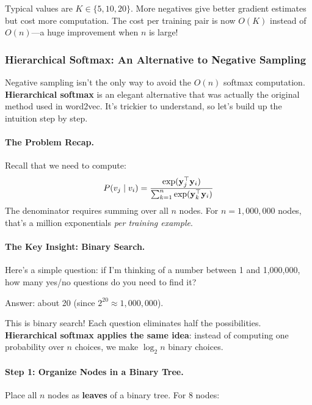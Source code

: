 \begin{notechapter}
\begin{remark}
Typical values are $K \in \{5, 10, 20\}$. More negatives give better gradient estimates but cost more computation. The cost per training pair is now $O(K)$ instead of $O(n)$---a huge improvement when $n$ is large!
\end{remark}

\subsubsection*{Hierarchical Softmax: An Alternative to Negative Sampling}

Negative sampling isn't the only way to avoid the $O(n)$ softmax computation. \textbf{Hierarchical softmax} is an elegant alternative that was actually the original method used in word2vec. It's trickier to understand, so let's build up the intuition step by step.

\paragraph{The Problem Recap.} Recall that we need to compute:
\[
P(v_j \mid v_i) = \frac{\exp(\mathbf{y}_j^\top \mathbf{y}_i)}{\sum_{k=1}^{n} \exp(\mathbf{y}_k^\top \mathbf{y}_i)}
\]
The denominator requires summing over all $n$ nodes. For $n = 1{,}000{,}000$ nodes, that's a million exponentials \emph{per training example}.

\paragraph{The Key Insight: Binary Search.} Here's a simple question: if I'm thinking of a number between 1 and 1{,}000{,}000, how many yes/no questions do you need to find it? 

Answer: about 20 (since $2^{20} \approx 1{,}000{,}000$).

This is binary search! Each question eliminates half the possibilities. \textbf{Hierarchical softmax applies the same idea}: instead of computing one probability over $n$ choices, we make $\log_2 n$ binary choices.

\paragraph{Step 1: Organize Nodes in a Binary Tree.}

Place all $n$ nodes as \textbf{leaves} of a binary tree. For 8 nodes:


\end{notechapter}
